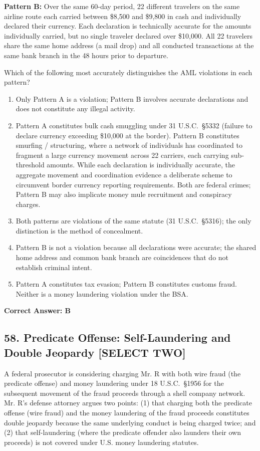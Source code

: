 \documentclass[11pt,a4paper]{article}
\begin{document}
	\textbf{Pattern B:} Over the same 60-day period, 22 different travelers on the same airline route each carried between \$8,500 and \$9,800 in cash and individually declared their currency. Each declaration is technically accurate for the amounts individually carried, but no single traveler declared over \$10,000. All 22 travelers share the same home address (a mail drop) and all conducted transactions at the same bank branch in the 48 hours prior to departure.
	
	Which of the following most accurately distinguishes the AML violations in each pattern?
	
	\begin{enumerate}[label=\Alph*.]
		\item Only Pattern A is a violation; Pattern B involves accurate declarations and does not constitute any illegal activity.
		\item Pattern A constitutes bulk cash smuggling under 31 U.S.C.\ \S 5332 (failure to declare currency exceeding \$10,000 at the border). Pattern B constitutes smurfing / structuring, where a network of individuals has coordinated to fragment a large currency movement across 22 carriers, each carrying sub-threshold amounts. While each declaration is individually accurate, the aggregate movement and coordination evidence a deliberate scheme to circumvent border currency reporting requirements. Both are federal crimes; Pattern B may also implicate money mule recruitment and conspiracy charges.
		\item Both patterns are violations of the same statute (31 U.S.C.\ \S 5316); the only distinction is the method of concealment.
		\item Pattern B is not a violation because all declarations were accurate; the shared home address and common bank branch are coincidences that do not establish criminal intent.
		\item Pattern A constitutes tax evasion; Pattern B constitutes customs fraud. Neither is a money laundering violation under the BSA.
	\end{enumerate}
	\textbf{Correct Answer: B}
	
	\subsection{58. Predicate Offense: Self-Laundering and Double Jeopardy \textnormal{[SELECT TWO]}}
	
	A federal prosecutor is considering charging Mr. R with both wire fraud (the predicate offense) and money laundering under 18 U.S.C.\ \S 1956 for the subsequent movement of the fraud proceeds through a shell company network. Mr. R's defense attorney argues two points: (1) that charging both the predicate offense (wire fraud) and the money laundering of the fraud proceeds constitutes double jeopardy because the same underlying conduct is being charged twice; and (2) that self-laundering (where the predicate offender also launders their own proceeds) is not covered under U.S. money laundering statutes.
	
\end{document}
